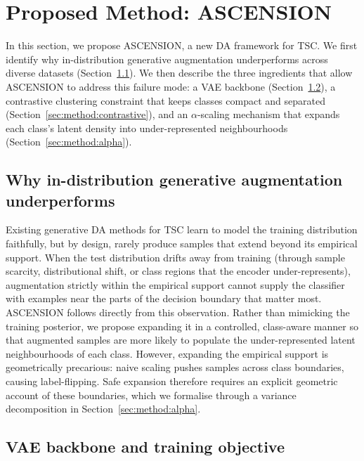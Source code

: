 \section{Proposed Method: ASCENSION}
\label{sec:method}

In this section, we propose ASCENSION, a new DA framework for
TSC. We first identify why
in-distribution generative augmentation underperforms across
diverse datasets (Section~\ref{sec:method:motivation}). We then
describe the three ingredients that allow ASCENSION to address
this failure mode: a VAE backbone
(Section~\ref{sec:method:vae}), a contrastive clustering
constraint that keeps classes compact and separated
(Section~\ref{sec:method:contrastive}), and an $\alpha$-scaling
mechanism that expands each class's latent density into
under-represented neighbourhoods
(Section~\ref{sec:method:alpha}).

\subsection{Why in-distribution generative augmentation underperforms}
\label{sec:method:motivation}

Existing generative DA methods for TSC
learn to model the training distribution faithfully, but by
design, rarely produce samples that extend beyond its empirical
support. When the test distribution drifts away from training (through sample scarcity, distributional shift, or class
regions that the encoder under-represents), augmentation
strictly within the empirical support cannot supply the
classifier with examples near the parts of the decision
boundary that matter most. 
ASCENSION follows directly from this observation. Rather than
mimicking the training posterior, we propose expanding
 it in a controlled, class-aware manner so that augmented
samples are more likely to populate the under-represented latent neighbourhoods of
each class. However, expanding the empirical support is
geometrically precarious: naive scaling pushes samples across
class boundaries, causing label-flipping. Safe expansion
therefore requires an explicit geometric account of these
boundaries, which we formalise through a variance decomposition
in Section~\ref{sec:method:alpha}.


\subsection{VAE backbone and training objective}
\label{sec:method:vae}\label{sec:method:contrastive}

